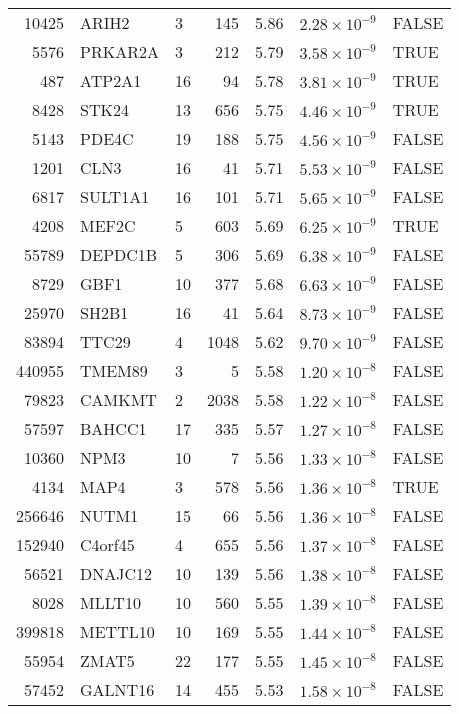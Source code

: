 \begin{table}[ht]
\begin{adjustbox}{totalheight=10in}
\begin{tabular}{rllrrrl}
  10425 & ARIH2 & 3 & 145 & 5.86 & $2.28 \times 10^{-9}$ & FALSE \\ 
  5576 & PRKAR2A & 3 & 212 & 5.79 & $3.58 \times 10^{-9}$ & TRUE \\ 
  487 & ATP2A1 & 16 &  94 & 5.78 & $3.81 \times 10^{-9}$ & TRUE \\ 
  8428 & STK24 & 13 & 656 & 5.75 & $4.46 \times 10^{-9}$ & TRUE \\ 
  5143 & PDE4C & 19 & 188 & 5.75 & $4.56 \times 10^{-9}$ & FALSE \\ 
  1201 & CLN3 & 16 &  41 & 5.71 & $5.53 \times 10^{-9}$ & FALSE \\ 
  6817 & SULT1A1 & 16 & 101 & 5.71 & $5.65 \times 10^{-9}$ & FALSE \\ 
  4208 & MEF2C & 5 & 603 & 5.69 & $6.25 \times 10^{-9}$ & TRUE \\ 
  55789 & DEPDC1B & 5 & 306 & 5.69 & $6.38 \times 10^{-9}$ & FALSE \\ 
  8729 & GBF1 & 10 & 377 & 5.68 & $6.63 \times 10^{-9}$ & FALSE \\ 
  25970 & SH2B1 & 16 &  41 & 5.64 & $8.73 \times 10^{-9}$ & FALSE \\ 
  83894 & TTC29 & 4 & 1048 & 5.62 & $9.70 \times 10^{-9}$ & FALSE \\ 
  440955 & TMEM89 & 3 &   5 & 5.58 & $1.20 \times 10^{-8}$ & FALSE \\ 
  79823 & CAMKMT & 2 & 2038 & 5.58 & $1.22 \times 10^{-8}$ & FALSE \\ 
  57597 & BAHCC1 & 17 & 335 & 5.57 & $1.27 \times 10^{-8}$ & FALSE \\ 
  10360 & NPM3 & 10 &   7 & 5.56 & $1.33 \times 10^{-8}$ & FALSE \\ 
  4134 & MAP4 & 3 & 578 & 5.56 & $1.36 \times 10^{-8}$ & TRUE \\ 
  256646 & NUTM1 & 15 &  66 & 5.56 & $1.36 \times 10^{-8}$ & FALSE \\ 
  152940 & C4orf45 & 4 & 655 & 5.56 & $1.37 \times 10^{-8}$ & FALSE \\ 
  56521 & DNAJC12 & 10 & 139 & 5.56 & $1.38 \times 10^{-8}$ & FALSE \\ 
  8028 & MLLT10 & 10 & 560 & 5.55 & $1.39 \times 10^{-8}$ & FALSE \\ 
  399818 & METTL10 & 10 & 169 & 5.55 & $1.44 \times 10^{-8}$ & FALSE \\ 
  55954 & ZMAT5 & 22 & 177 & 5.55 & $1.45 \times 10^{-8}$ & FALSE \\ 
  57452 & GALNT16 & 14 & 455 & 5.53 & $1.58 \times 10^{-8}$ & FALSE \\ 

\end{tabular}
\end{adjustbox}
\end{table}
